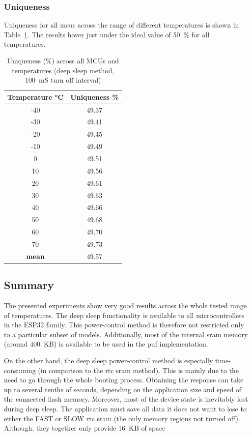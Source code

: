 \subsubsection*{Uniqueness}

Uniqueness for all \glspl{mcu} across the range of different temperatures is shown in Table~\ref{table:uniqueness_deep_sleep}. The results hover just under the ideal value of 50~\% for all temperatures.

\begin{table}[ht!]
    \centering
    \begin{tabular}{cc}
        \textbf{Temperature °C} & \textbf{Uniqueness \%} \\
    \toprule
    -40  & 49.37 \\
    -30  & 49.41 \\
    -20  & 49.45 \\
    -10  & 49.49 \\
    0    & 49.51 \\
    10   & 49.56 \\
    20   & 49.61 \\
    30   & 49.63 \\
    40   & 49.66 \\
    50   & 49.68 \\
    60   & 49.70 \\
    70   & 49.73 \\
    \textbf{mean} & 49.57 \\
    \bottomrule
    \end{tabular}
    \captionsetup{justification=centering,margin=0.5cm}
    \caption{Uniqueness (\%) across all MCUs and temperatures (deep sleep method, 100~mS turn off interval)}
    \label{table:uniqueness_deep_sleep}
\end{table}

\subsection{Summary}

The presented experiments show very good results across the whole tested range of temperatures. The deep sleep functionality is available to all microcontrollers in the ESP32 family. This power-control method is therefore not restricted only to a particular subset of models. Additionally, most of the internal \gls{sram} memory (around 400~KB) is available to be used in the \gls{puf} implementation.

On the other hand, the deep sleep power-control method is especially time-consuming (in comparison to the \gls{rtc} \gls{sram} method). This is mainly due to the need to go through the whole booting process. Obtaining the response can take up to several tenths of seconds, depending on the application size and speed of the connected flash memory. Moreover, most of the device state is inevitably lost during deep sleep. The application must save all data it does not want to lose to either the FAST or SLOW \gls{rtc} \gls{sram} (the only memory regions not turned off). Although, they together only provide 16~KB of space

